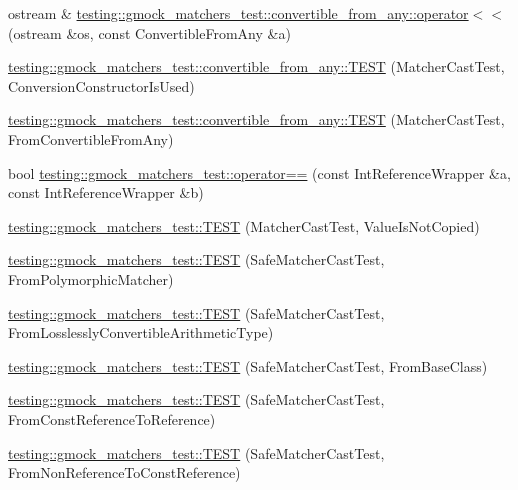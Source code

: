 \begin{DoxyCompactItemize}
\item 
ostream \& \mbox{\hyperlink{namespacetesting_1_1gmock__matchers__test_1_1convertible__from__any_a8bc42601c60dc9c5e42861c922d63e64}{testing\+::gmock\+\_\+matchers\+\_\+test\+::convertible\+\_\+from\+\_\+any\+::operator$<$$<$}} (ostream \&os, const Convertible\+From\+Any \&a)
\item 
\mbox{\hyperlink{namespacetesting_1_1gmock__matchers__test_1_1convertible__from__any_af5ebdc7f68d7e1e48c6dacfaffd6f58a}{testing\+::gmock\+\_\+matchers\+\_\+test\+::convertible\+\_\+from\+\_\+any\+::\+T\+E\+ST}} (Matcher\+Cast\+Test, Conversion\+Constructor\+Is\+Used)
\item 
\mbox{\hyperlink{namespacetesting_1_1gmock__matchers__test_1_1convertible__from__any_a72a4c336022bdea69ce15ba085f0e58e}{testing\+::gmock\+\_\+matchers\+\_\+test\+::convertible\+\_\+from\+\_\+any\+::\+T\+E\+ST}} (Matcher\+Cast\+Test, From\+Convertible\+From\+Any)
\item 
bool \mbox{\hyperlink{namespacetesting_1_1gmock__matchers__test_a33c068c32bf5118e5be92771b146db77}{testing\+::gmock\+\_\+matchers\+\_\+test\+::operator==}} (const Int\+Reference\+Wrapper \&a, const Int\+Reference\+Wrapper \&b)
\item 
\mbox{\hyperlink{namespacetesting_1_1gmock__matchers__test_ae99c08c8a815964b61f98a4785cf79b5}{testing\+::gmock\+\_\+matchers\+\_\+test\+::\+T\+E\+ST}} (Matcher\+Cast\+Test, Value\+Is\+Not\+Copied)
\item 
\mbox{\hyperlink{namespacetesting_1_1gmock__matchers__test_a29c04361c022a71711dbf9d3cf2a5050}{testing\+::gmock\+\_\+matchers\+\_\+test\+::\+T\+E\+ST}} (Safe\+Matcher\+Cast\+Test, From\+Polymorphic\+Matcher)
\item 
\mbox{\hyperlink{namespacetesting_1_1gmock__matchers__test_a70bbe53742db988a828d9e8201e34770}{testing\+::gmock\+\_\+matchers\+\_\+test\+::\+T\+E\+ST}} (Safe\+Matcher\+Cast\+Test, From\+Losslessly\+Convertible\+Arithmetic\+Type)
\item 
\mbox{\hyperlink{namespacetesting_1_1gmock__matchers__test_a937469149aee65efde526091af1e4f78}{testing\+::gmock\+\_\+matchers\+\_\+test\+::\+T\+E\+ST}} (Safe\+Matcher\+Cast\+Test, From\+Base\+Class)
\item 
\mbox{\hyperlink{namespacetesting_1_1gmock__matchers__test_a14ba7c67551222321056e4da6708010f}{testing\+::gmock\+\_\+matchers\+\_\+test\+::\+T\+E\+ST}} (Safe\+Matcher\+Cast\+Test, From\+Const\+Reference\+To\+Reference)
\item 
\mbox{\hyperlink{namespacetesting_1_1gmock__matchers__test_ad53741423311d4f76d9d980f59ec8d65}{testing\+::gmock\+\_\+matchers\+\_\+test\+::\+T\+E\+ST}} (Safe\+Matcher\+Cast\+Test, From\+Non\+Reference\+To\+Const\+Reference)

\end{DoxyCompactItemize}
